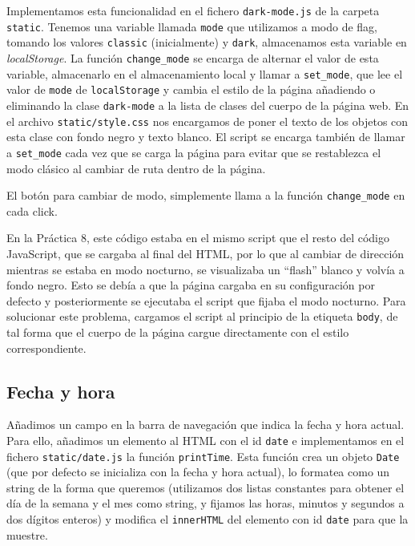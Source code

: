 \documentclass{article}
\begin{document}
Implementamos esta funcionalidad en el fichero \texttt{dark-mode.js}
de la carpeta \texttt{static}. Tenemos una variable llamada
\texttt{mode} que utilizamos a modo de flag, tomando los valores
\texttt{classic} (inicialmente) y \texttt{dark}, almacenamos esta
variable en \textit{localStorage}. La función \texttt{change\_mode} se
encarga de alternar el valor de esta variable, almacenarlo en el
almacenamiento local y llamar a \texttt{set\_mode}, que lee el valor
de \texttt{mode} de \texttt{localStorage} y cambia el estilo de la
página añadiendo o eliminando la clase \texttt{dark-mode} a la lista
de clases del cuerpo de la página web. En el archivo
\texttt{static/style.css} nos encargamos de poner el texto de los
objetos con esta clase con fondo negro y texto blanco.  El script se
encarga también de llamar a \texttt{set\_mode} cada vez que se carga
la página para evitar que se restablezca el modo clásico al cambiar de
ruta dentro de la página.

El botón para cambiar de modo, simplemente llama a la función
\texttt{change\_mode} en cada click.

En la Práctica 8, este código estaba en el mismo script que el resto
del código JavaScript, que se cargaba al final del HTML, por lo que al
cambiar de dirección mientras se estaba en modo nocturno, se
visualizaba un ``flash'' blanco y volvía a fondo negro. Esto se debía
a que la página cargaba en su configuración por defecto y
posteriormente se ejecutaba el script que fijaba el modo
nocturno. Para solucionar este problema, cargamos el script al
principio de la etiqueta \texttt{body}, de tal forma que el cuerpo de
la página cargue directamente con el estilo correspondiente.

\subsection{Fecha y hora}

Añadimos un campo en la barra de navegación que indica la fecha y hora
actual. Para ello, añadimos un elemento al HTML con el id
\texttt{date} e implementamos en el fichero \texttt{static/date.js} la
función \texttt{printTime}. Esta función crea un objeto \texttt{Date}
(que por defecto se inicializa con la fecha y hora actual), lo
formatea como un string de la forma que queremos (utilizamos dos
listas constantes para obtener el día de la semana y el mes como
string, y fijamos las horas, minutos y segundos a dos dígitos enteros)
y modifica el \texttt{innerHTML} del elemento con id \texttt{date}
para que la muestre.
\end{document}
